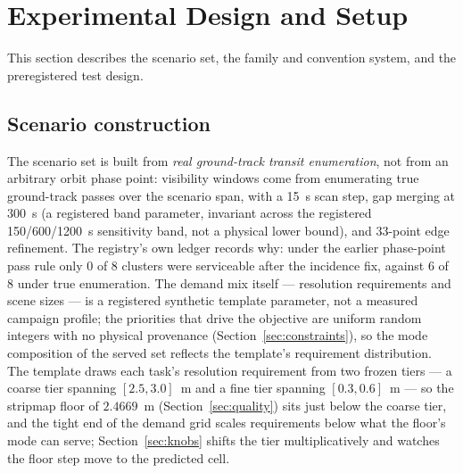 \documentclass[preprint,authoryear]{elsarticle}
\begin{document}
\section{Experimental Design and Setup}\label{sec:testdesign}

This section describes the scenario set, the family and convention system, and the preregistered test design.

\subsection{Scenario construction}\label{sec:scenarios}

The scenario set is built from \emph{real ground-track transit enumeration}, not from an arbitrary orbit phase point: visibility windows come from enumerating true ground-track passes over the scenario span, with a 15~s scan step, gap merging at 300~s (a registered band parameter, invariant across the registered 150/600/1200~s sensitivity band, not a physical lower bound), and 33-point edge refinement. The registry's own ledger records why: under the earlier phase-point pass rule only 0 of 8 clusters were serviceable after the incidence fix, against 6 of 8 under true enumeration. The demand mix itself --- resolution requirements and scene sizes --- is a registered synthetic template parameter, not a measured campaign profile; the priorities that drive the objective are uniform random integers with no physical provenance (Section~\ref{sec:constraints}), so the mode composition of the served set reflects the template's requirement distribution. The template draws each task's resolution requirement from two frozen tiers --- a coarse tier spanning $[2.5, 3.0]$~m and a fine tier spanning $[0.3, 0.6]$~m --- so the stripmap floor of $2.4669$~m (Section~\ref{sec:quality}) sits just below the coarse tier, and the tight end of the demand grid scales requirements below what the floor's mode can serve; Section~\ref{sec:knobs} shifts the tier multiplicatively and watches the floor step move to the predicted cell.
\end{document}
